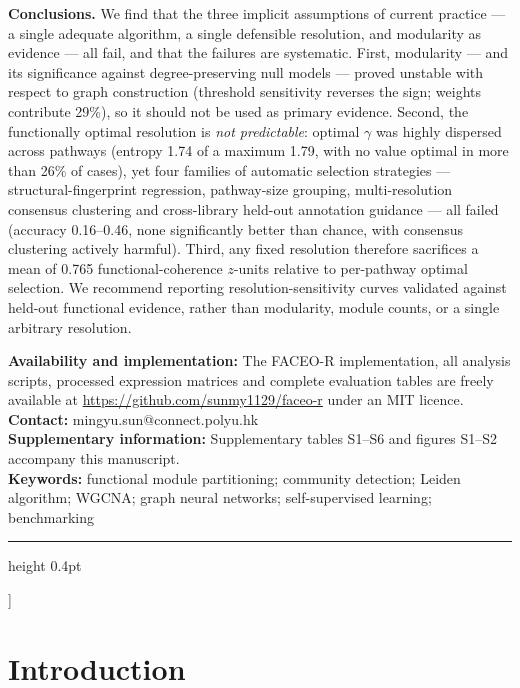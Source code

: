 \documentclass[twocolumn,10pt,a4paper]{article}
\begin{document}
{\begin{minipage}{0.955\textwidth}
\vspace{4pt}
\noindent\textbf{Conclusions.} We find that the three implicit assumptions of current
practice --- a single adequate algorithm, a single defensible resolution, and modularity as
evidence --- all fail, and that the failures are systematic. First,
modularity --- and its significance against degree-preserving null models --- proved unstable
with respect to graph construction (threshold sensitivity reverses the sign; weights
contribute 29\%), so it should not be used as primary evidence. Second, the functionally optimal
resolution is \emph{not predictable}: optimal $\gamma$ was highly dispersed across pathways
(entropy 1.74 of a maximum 1.79, with no value optimal in more than 26\% of cases), yet four
families of automatic selection strategies --- structural-fingerprint regression, pathway-size
grouping, multi-resolution consensus clustering and cross-library held-out annotation
guidance --- all failed (accuracy 0.16--0.46, none significantly better than chance, with
consensus clustering actively harmful). Third, any fixed resolution therefore sacrifices a
mean of 0.765 functional-coherence $z$-units relative to per-pathway optimal selection. We
recommend reporting resolution-sensitivity curves validated against held-out functional
evidence, rather than modularity, module counts, or a single arbitrary resolution.

\vspace{6pt}
\noindent\textbf{Availability and implementation:} The FACEO-R implementation, all
analysis scripts, processed expression matrices and complete evaluation tables are freely
available at \url{https://github.com/sunmy1129/faceo-r} under an MIT licence.\\
\noindent\textbf{Contact:} mingyu.sun@connect.polyu.hk\\
\noindent\textbf{Supplementary information:} Supplementary tables S1--S6 and figures
S1--S2 accompany this manuscript.\\
\noindent\textbf{Keywords:} functional module partitioning; community detection; Leiden
algorithm; WGCNA; graph neural networks; self-supervised learning; benchmarking
\end{minipage}
\vspace{0.30em}
\hrule height 0.4pt
\vspace{0.85em}
}]

\vspace{2pt}

\section{Introduction}
\end{document}
